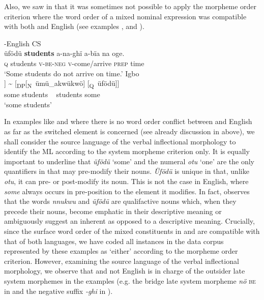 \documentclass[output=paper]{langsci/langscibook}
\begin{document}
Also, we saw in  that it was sometimes not possible to apply the morpheme order criterion where the word order of a mixed nominal expression was compatible with both  and English (see examples , and ).

\ea\label{ex:ihemere:22}
\ea {}-English CS\\
\gll üfödü  \textbf{students}  a-na-ghï   a-bïa    na   oge.\\
     \textsc{q}     students  \textsc{v-be-neg}  \textsc{v}-come/arrive  \textsc{prep}  time   \\
\glt ‘Some students do not arrive on time.’
\ex
{Igbo} \\
\gll [\textsubscript{DP}[\textsubscript{Q}~üfödü]  [\textsubscript{N}~ümü\_akwükwö]] {\textasciitilde} [\textsubscript{DP}[\textsubscript{N}~ümü\_akwükwö]  [\textsubscript{Q}~üfödü]]\\
    {\hphantom{[\textsubscript{DP}[\textsubscript{Q}~}}some %
    {\hphantom{[\textsubscript{N}~}}students %
       ~ %
    {\hphantom{[\textsubscript{DP}[\textsubscript{N}~}}students %
    {\hphantom{[\textsubscript{Q}~}}some\\
\glt ‘some students’
\z
\z

In examples like  and  where there is no word order conflict between  and English as far as the switched element is concerned (see already discussion in  above), we shall consider the source language of the verbal inflectional morphology to identify the ML according to the system morpheme criterion only. It is equally important to underline that \textit{üfödü} ‘some’ and the numeral \textit{otu} ‘one’ are the only quantifiers in  that may pre-modify their nouns. \textit{Üfödü} is unique in that, unlike \textit{otu}, it can pre- or post-modify its noun. This is not the case in English, where \textit{some} always occurs in pre-position to the element it modifies. In fact, \citet[239]{MadukaDurunze1990} observes that the  words \textit{nnukwu} and \textit{üfödü} are qualifactive nouns which, when they precede their nouns, become emphatic in their descriptive meaning or ambiguously suggest an inherent as opposed to a descriptive meaning. Crucially, since the surface word order of the mixed constituents in  and  are compatible with that of both languages, we have coded all instances in the data corpus represented by these examples as ‘either’ according to the morpheme order criterion. However, examining the source language of the verbal inflectional morphology, we observe that  and not English is in charge of the outsider late system morphemes in the examples (e.g. the bridge late system morpheme \textit{nö} \textsc{be} in  and the negative suffix \textit{-ghi} in ). 
\end{document}
